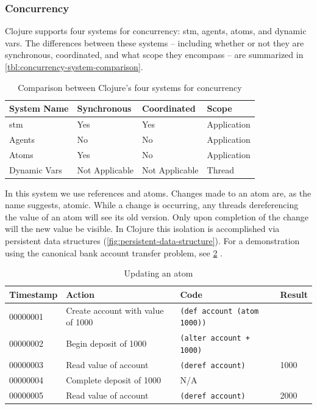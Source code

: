 		\subsubsection{Concurrency}
			Clojure supports four systems for concurrency:  \gls{stm}, agents, atoms, and dynamic vars.  The differences between these systems -- including whether or not they are synchronous, coordinated, and what scope they encompass -- are summarized in \vref{tbl:concurrency-system-comparison}.
			
			\begin{table}
				\centering
				
				\begin{tabular}{llll}
					\toprule
					System Name & Synchronous & Coordinated & Scope \\
					\midrule
					\gls{stm} & Yes & Yes & Application \\
					Agents & No & No & Application \\
					Atoms & Yes & No & Application \\
					Dynamic Vars & Not Applicable & Not Applicable & Thread \\
					\bottomrule
				\end{tabular}
				
				\caption{Comparison between Clojure's four systems for concurrency}
				\label{tbl:concurrency-system-comparison}
			\end{table}
			
			In this system we use references and atoms.  Changes made to an atom are, as the name suggests, atomic.  While a change is occurring, any threads dereferencing the value of an atom will see its old version.  Only upon completion of the change will the new value be visible.  In Clojure this isolation is accomplished via persistent data structures (\cref{fig:persistent-data-structure}).  For a demonstration using the canonical bank account transfer problem, see \cref{tbl:updating-an-atom} \cite{bank-problem}.
			
			\begin{table}
				\centering
				
				\begin{tabular}{llll}
					\toprule
					Timestamp & Action & Code & Result \\
					\midrule
					00000001 & Create account with value of 1000 & \texttt{(def account (atom 1000))} &  \\
					00000002 & Begin deposit of 1000 & \texttt{(alter account + 1000)} &  \\
					00000003 & Read value of account & \texttt{(deref account)} & 1000 \\
					00000004 & Complete deposit of 1000 & N/A &  \\
					00000005 & Read value of account & \texttt{(deref account)} & 2000 \\
					\bottomrule
				\end{tabular}
				
				\caption{Updating an atom}
				\label{tbl:updating-an-atom}
			\end{table}
			
